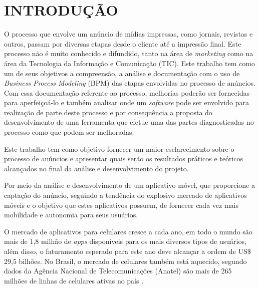 \documentclass[
	12pt,				%
	openright,			%
	oneside,			%
	a4paper,			%
	chapter=TITLE,		%
	section=TITLE,		%
	english,			%
	french,				%
	spanish,			%
	brazil				%
	]{abntex2}
\begin{document}
\textual



\chapter{INTRODUÇÃO}

O processo que envolve um anúncio de mídias impressas, como jornais, revistas e outros, passam por diversas etapas desde o cliente até a impressão final. Este processo não é muito conhecido e difundido, tanto na área de \textit{marketing} como na área da Tecnologia da Informação e Comunicação (TIC). Este trabalho tem como um de seus objetivos a compreensão, a análise e documentação com o uso de \textit{Business Process Modeling} (BPM) das etapas envolvidas no processo de anúncios. Com essa documentação referente ao processo, melhorias poderão ser fornecidas para aperfeiçoá-lo e também analisar onde um \textit{software} pode ser envolvido para realização de parte deste processo e por consequência a proposta do desenvolvimento de uma ferramenta que efetue uma das partes diagnosticadas no processo como que podem ser melhoradas. 

Este trabalho tem como objetivo fornecer um maior esclarecimento sobre o processo de anúncios e apresentar quais serão os resultados práticos e teóricos alcançados no final da análise e desenvolvimento do projeto.

Por meio da análise e desenvolvimento de um aplicativo móvel, que proporcione a captação do anúncio, seguindo a tendência do explosivo mercado de aplicativos móveis e o objetivo que estes aplicativos possuem, de fornecer cada vez mais mobilidade e autonomia para seus usuários. 

\begin{citacao}
O mercado de aplicativos para celulares cresce a cada ano, em todo o mundo são mais de 1,8 milhão de \textit{apps} disponíveis para os mais diversos tipos de usuários, além disso, o faturamento esperado para este ano deve alcançar a ordem de US\$ 29,5 bilhões. No Brasil, o mercado de celulares também está aquecido, segundo dados da Agência Nacional de Telecomunicações (Anatel) são mais de 265 milhões de linhas de celulares ativas no país \cite{sebrae2014}.
\end{citacao}
\end{document}
